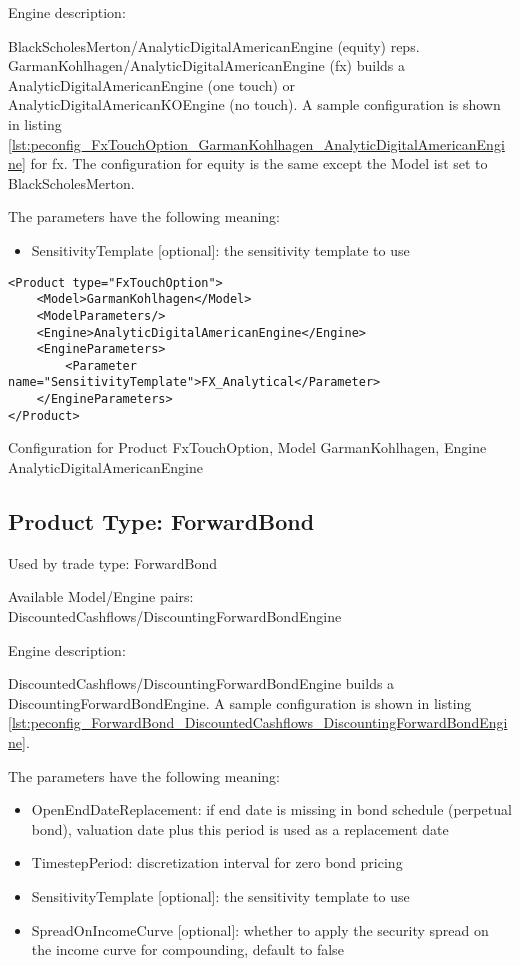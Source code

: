 Engine description:

BlackScholesMerton/AnalyticDigitalAmericanEngine (equity) reps. GarmanKohlhagen/AnalyticDigitalAmericanEngine (fx)
builds a AnalyticDigitalAmericanEngine (one touch) or AnalyticDigitalAmericanKOEngine (no touch). A sample configuration
is shown in listing \ref{lst:peconfig_FxTouchOption_GarmanKohlhagen_AnalyticDigitalAmericanEngine} for fx. The
configuration for equity is the same except the Model ist set to BlackScholesMerton.

The parameters have the following meaning:

\begin{itemize}
\item SensitivityTemplate [optional]: the sensitivity template to use 
\end{itemize}

\begin{longlisting}
\begin{verbatim}
<Product type="FxTouchOption">
    <Model>GarmanKohlhagen</Model>
    <ModelParameters/>
    <Engine>AnalyticDigitalAmericanEngine</Engine>
    <EngineParameters>
        <Parameter name="SensitivityTemplate">FX_Analytical</Parameter>
    </EngineParameters>
</Product>
\end{verbatim}
\caption{Configuration for Product FxTouchOption, Model GarmanKohlhagen, Engine AnalyticDigitalAmericanEngine}
\label{lst:peconfig_FxTouchOption_GarmanKohlhagen_AnalyticDigitalAmericanEngine}
\end{longlisting}

\subsection{Product Type: ForwardBond}

Used by trade type: ForwardBond

Available Model/Engine pairs: DiscountedCashflows/DiscountingForwardBondEngine

Engine description:

DiscountedCashflows/DiscountingForwardBondEngine builds a DiscountingForwardBondEngine. A sample configuration is shown
in listing \ref{lst:peconfig_ForwardBond_DiscountedCashflows_DiscountingForwardBondEngine}.

The parameters have the following meaning:

\begin{itemize}
\item OpenEndDateReplacement: if end date is missing in bond schedule (perpetual bond), valuation date plus this period is used as a replacement date
\item TimestepPeriod: discretization interval for zero bond pricing
\item SensitivityTemplate [optional]: the sensitivity template to use
\item SpreadOnIncomeCurve [optional]: whether to apply the security spread on the income curve for compounding, default to false
\end{itemize}

